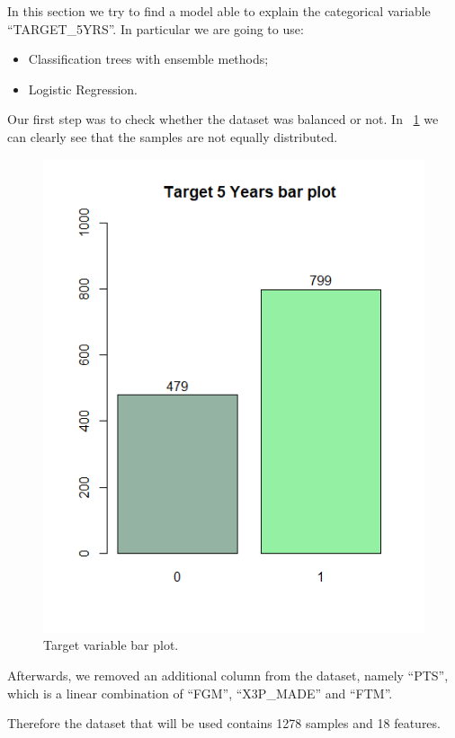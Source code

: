 In this section we try to find a model able to explain the categorical variable ``TARGET\_5YRS''.
In particular we are going to use:
\begin{itemize}
	\item Classification trees with ensemble methods;
	\item Logistic Regression.
\end{itemize}

Our first step was to check whether the dataset was balanced or not. In \Fig~\ref{fig:target_bar_plot} we can clearly see that the samples are not equally distributed. 

\begin{figure}[h]
	\centering
	\includegraphics[width=0.5\linewidth]{ImageFiles/Histograms/target_bar_plot}
	\caption{Target variable bar plot.}
	\label{fig:target_bar_plot}
\end{figure}

Afterwards, we removed an additional column from the dataset, namely ``PTS'', which is a linear combination of ``FGM'', ``X3P\_MADE'' and ``FTM''.

Therefore the dataset that will be used contains 1278 samples and 18 features.

